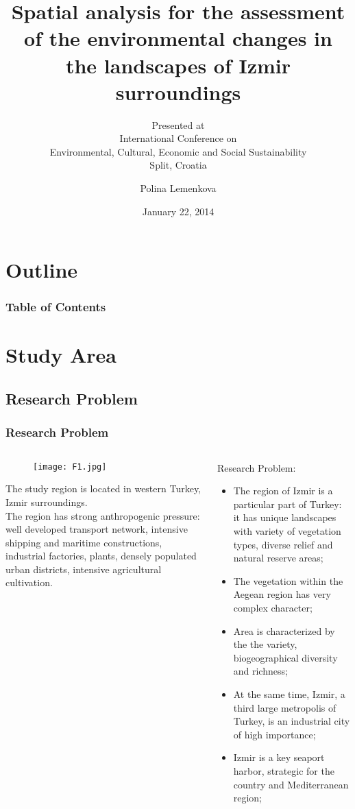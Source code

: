 \documentclass[pdflatex,compress,8pt,
	xcolor={dvipsnames,dvipsnames,svgnames,x11names,table},
	hyperref={colorlinks = true,
	breaklinks = true, 
	urlcolor = NavyBlue, 
	breaklinks = true}]{beamer}
\title{Spatial analysis for the assessment of the environmental changes in the landscapes of Izmir surroundings}
\subtitle{Presented at \\
\nth{10} International Conference on \\
Environmental, Cultural, Economic and Social Sustainability\\
Split, Croatia}
\author{Polina Lemenkova}
\date{January 22, 2014}
\begin{document}
\begin{frame}
           \titlepage
\end{frame}

\section*{Outline}
 \begin{frame}\frametitle{Table of Contents}
           \tableofcontents
\end{frame}

\section{Study Area}
\subsection{Research Problem}
\begin{frame}\frametitle{Research Problem}
\begin{minipage}[0.4\textheight]{\textwidth}
\begin{columns}[T]
\begin{column}{0.5\textwidth}
\vspace{2em}
\begin{figure}[H]
	\centering
		\texttt{[image: F1.jpg]}
\end{figure}
\small{The study region is located in western Turkey, Izmir surroundings. \\
The region has strong anthropogenic pressure: well developed transport network, intensive shipping and maritime constructions, industrial factories, plants, densely populated urban districts, intensive agricultural cultivation.
}
\end{column}
\begin{column}{0.5\textwidth}
\vspace{2em} 
Research Problem: 
\begin{itemize}
	\item The region of Izmir is a particular part of Turkey: it has unique landscapes with variety of vegetation types, diverse relief and natural reserve areas;
	\item The vegetation within the Aegean region has very complex character;
	\item Area is characterized by the the variety, biogeographical diversity and richness;
	\item At the same time, Izmir, a third large metropolis of Turkey, is an industrial city of high importance;
	\item Izmir is a key seaport harbor, strategic for the country and Mediterranean region;
\end{itemize}
\end{column}
\end{columns}
\end{minipage}
\end{frame}
\end{document}

